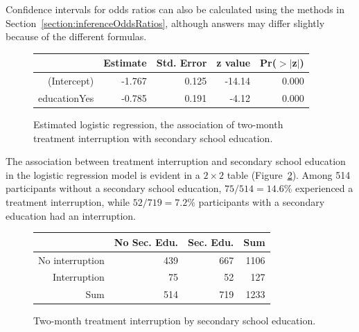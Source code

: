 Confidence intervals for odds ratios can also be calculated using the methods in Section~\ref{section:inferenceOddsRatios}, although answers may differ slightly because of the different formulas.

\begin{figure}[ht]
\centering
\begin{tabular}{rrrrr}
  \hline
 & Estimate & Std. Error & z value & Pr($>$$|$z$|$) \\
  \hline
(Intercept) & -1.767 & 0.125 & -14.14 & 0.000 \\
  educationYes & -0.785 & 0.191 & -4.12 & 0.000 \\
   \hline
\end{tabular}
\caption{Estimated logistic regression, the association of two-month treatment interruption with secondary school education.}
\label{figure:tbInterruptionEduLogReg}
\end{figure}

The association between treatment interruption and secondary school education in the logistic regression model is evident in a $2 \times 2$ table (Figure~\ref{figure:tbInterruptionEduExample}). Among 514 participants without a secondary school education, $75/514 = 14.6\%$ experienced a treatment interruption, while $52/719 = 7.2\%$ participants with a secondary education had an interruption.


\begin{figure}[ht]
\centering
\begin{tabular}{rrrr}
  \hline
 & No Sec. Edu. & Sec. Edu. & Sum \\
  \hline
No interruption & 439 & 667 & 1106 \\
  Interruption & 75 & 52 & 127 \\
  Sum & 514 & 719 & 1233 \\
   \hline
\end{tabular}
\caption{Two-month treatment interruption by secondary school education.}
\label{figure:tbInterruptionEduExample}
\end{figure}


